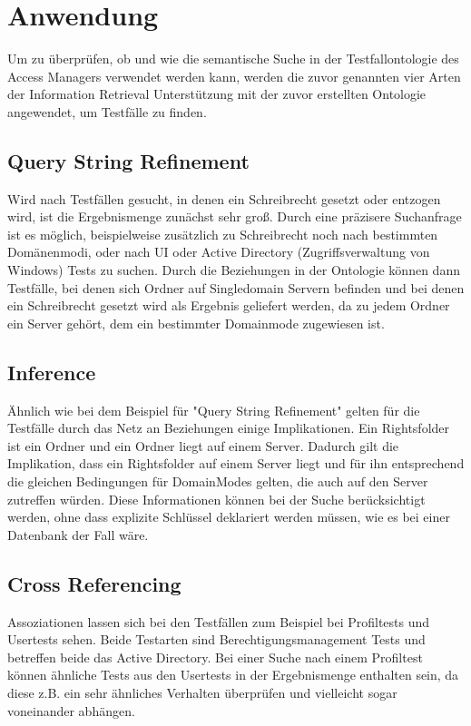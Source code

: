 \section{Anwendung}
Um zu überprüfen, ob und wie die semantische Suche in der Testfallontologie des Access Managers verwendet werden kann, werden die zuvor genannten vier Arten der \glqq Information Retrieval\grqq{} Unterstützung mit der zuvor erstellten Ontologie angewendet, um Testfälle zu finden.

\subsection*{Query String Refinement}
Wird nach Testfällen gesucht, in denen ein Schreibrecht gesetzt oder entzogen wird, ist die Ergebnismenge zunächst sehr groß. Durch eine präzisere Suchanfrage ist es möglich, beispielweise zusätzlich zu Schreibrecht noch nach bestimmten Domänenmodi, oder nach UI oder Active Directory (Zugriffsverwaltung von Windows) Tests zu suchen. Durch die Beziehungen in der Ontologie können dann Testfälle, bei denen sich Ordner auf Singledomain Servern befinden und bei denen ein Schreibrecht gesetzt wird als Ergebnis geliefert werden, da zu jedem Ordner ein Server gehört, dem ein bestimmter Domainmode zugewiesen ist.

\subsection*{Inference}
Ähnlich wie bei dem Beispiel für "Query String Refinement" gelten für die Testfälle durch das Netz an Beziehungen einige Implikationen. Ein Rightsfolder ist ein Ordner und ein Ordner liegt auf einem Server. Dadurch gilt die Implikation, dass ein Rightsfolder auf einem Server liegt und für ihn entsprechend die gleichen Bedingungen für DomainModes gelten, die auch auf den Server zutreffen würden. Diese Informationen können bei der Suche berücksichtigt werden, ohne dass explizite Schlüssel deklariert werden müssen, wie es bei einer Datenbank der Fall wäre. 

\subsection*{Cross Referencing}
Assoziationen lassen sich bei den Testfällen zum Beispiel bei Profiltests und Usertests sehen. Beide Testarten sind Berechtigungsmanagement Tests und betreffen beide das Active Directory. Bei einer Suche nach einem Profiltest können ähnliche Tests aus den Usertests in der Ergebnismenge enthalten sein, da diese z.B. ein sehr ähnliches Verhalten überprüfen und vielleicht sogar voneinander abhängen.

